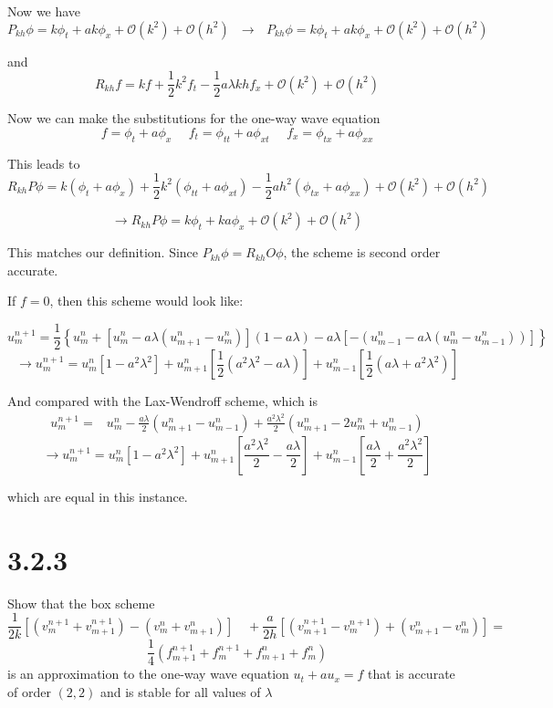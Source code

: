 \documentclass[12pt]{article}
\begin{document}
\noindent Now we have
$$ P_{kh}\phi = k\phi_t + ak\phi_{x} + \mathcal{O}(k^2) + \mathcal{O}(h^2)  ~~~ \longrightarrow ~~~ P_{kh}\phi = k\phi_t + ak\phi_{x} + \mathcal{O}(k^2) + \mathcal{O}(h^2)$$

\noindent and
$$ R_{kh}f = kf + \frac{1}{2}k^2f_t  - \frac{1}{2}a\lambda khf_x  + \mathcal{O}(k^2) + \mathcal{O}(h^2) $$

\noindent Now we can make the substitutions for the one-way wave equation
$$ f = \phi_t + a\phi_x ~~~~~~ f_t = \phi_{tt} + a\phi_{xt} ~~~~~~  f_x = \phi_{tx} + a\phi_{xx} $$

\noindent This leads to
$$ R_{kh}P\phi = k(\phi_t + a\phi_x) + \frac{1}{2}k^2(\phi_{tt} + a\phi_{xt})  - \frac{1}{2}ah^2(\phi_{tx} + a\phi_{xx})  + \mathcal{O}(k^2) + \mathcal{O}(h^2)$$

$$ \longrightarrow  R_{kh}P\phi = k\phi_t + ka\phi_x + \mathcal{O}(k^2) + \mathcal{O}(h^2)$$

\noindent This matches our definition. Since $P_{kh}\phi = R_{kh}O\phi$, the scheme is second order accurate.

If $f=0$, then this scheme would look like:

$$
u_{m}^{n+1}=\frac{1}{2}\left\{u_{m}^{n}+\left[u_{m}^{n}-a \lambda(u_{m+1}^{n}-u_{m}^{n})\right]   (1 - a\lambda)  -a \lambda\left[-(u_{m-1}^{n}-a \lambda(u_{m}^{n}-u_{m-1}^{n}))\right]\right\} 
$$
$$\longrightarrow u_m^{n+1} = 
    u_{m}^{n}\left[1-a^2\lambda^2\right] + 
    u_{m+1}^{n}\left[\frac{1}{2}(a^2\lambda^2 -a\lambda)\right] + 
    u_{m-1}^{n}\left[\frac{1}{2}(a\lambda + a^2\lambda^2)\right]  $$


\noindent And compared with the Lax-Wendroff scheme, which is
$$
\begin{aligned}
u_{m}^{n+1}=& u_{m}^{n}-\frac{a \lambda}{2}\left(u_{m+1}^{n}-u_{m-1}^{n}\right)+\frac{a^{2} \lambda^{2}}{2}\left(u_{m+1}^{n}-2 u_{m}^{n}+u_{m-1}^{n}\right)
\end{aligned}
$$
$$\longrightarrow u_m^{n+1} = u_m^n\left[1-a^2\lambda^2\right] + u_{m+1}^n\left[\frac{a^2\lambda^2}{2} - \frac{a\lambda}{2}\right] + u_{m-1}^n\left[\frac{a\lambda}{2} + \frac{a^2\lambda^2}{2}\right] $$

\noindent which are equal in this instance.

\section*{3.2.3}
Show that the box scheme
$$
\frac{1}{2 k}\left[\left(v_{m}^{n+1}+v_{m+1}^{n+1}\right)-\left(v_{m}^{n}+v_{m+1}^{n}\right)\right]
\quad+\frac{a}{2 h}\left[\left(v_{m+1}^{n+1}-v_{m}^{n+1}\right)+\left(v_{m+1}^{n}-v_{m}^{n}\right)\right]
=$$
$$\frac{1}{4}\left(f_{m+1}^{n+1}+f_{m}^{n+1}+f_{m+1}^{n}+f_{m}^{n}\right)$$
is an approximation to the one-way wave equation $u_{t}+a u_{x}=f$ that is accurate of order $(2,2)$ and is stable for all values of $\lambda$
\end{document}
